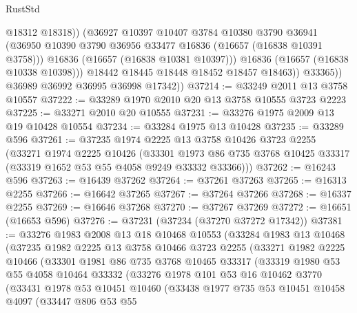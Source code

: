 \begin{lexlean}{RustStd}
\begin{coremodule}
                      @18312
                      @18318))
                  (@36927
                    @10397
                    @10407
                    @3784
                    @10380
                    @3790
                    @36941
                    (@36950 @10390 @3790 @36956 @33477 @16836 (@16657 (@16838 @10391 @3758)))
                    @16836
                    (@16657 (@16838 @10381 @10397)))
                  @16836
                  (@16657 (@16838 @10338 @10398)))
                @18442
                @18445
                @18448
                @18452
                @18457
                @18463))
            @33365))
        @36989
        @36992
        @36995
        @36998
        @17342))
@37214 := @33249 @2011 @13 @3758 @10557
@37222 := @33289 @1970 @2010 @20 @13 @3758 @10555 @3723 @2223
@37225 := @33271 @2010 @20 @10555
@37231 := @33276 @1975 @2009 @13 @19 @10428 @10554
@37234 := @33284 @1975 @13 @10428
@37235 := @33289 @596
@37261 := @37235
    @1974
    @2225
    @13
    @3758
    @10426
    @3723
    @2255
    (@33271
      @1974
      @2225
      @10426
      (@33301 @1973 @86 @735 @3768 @10425 @33317 (@33319 @1652 @53 @55 @4058 @9249 @33332 @33366)))
@37262 := @16243 @596
@37263 := @16439 @37262
@37264 := @37261 @37263
@37265 := @16313 @2255
@37266 := @16642 @37265
@37267 := @37264 @37266
@37268 := @16337 @2255
@37269 := @16646 @37268
@37270 := @37267 @37269
@37272 := @16651 (@16653 @596)
@37276 := @37231 (@37234 (@37270 @37272 @17342))
@37381 := @33276
    @1983
    @2008
    @13
    @18
    @10468
    @10553
    (@33284
      @1983
      @13
      @10468
      (@37235
        @1982
        @2225
        @13
        @3758
        @10466
        @3723
        @2255
        (@33271
          @1982
          @2225
          @10466
          (@33301
            @1981
            @86
            @735
            @3768
            @10465
            @33317
            (@33319
              @1980
              @53
              @55
              @4058
              @10464
              @33332
              (@33276
                @1978
                @101
                @53
                @16
                @10462
                @3770
                (@33431
                  @1978
                  @53
                  @10451
                  @10460
                  (@33438
                    @1977
                    @735
                    @53
                    @10451
                    @10458
                    @4097
                    (@33447
                      @806
                      @53
                      @55

\end{coremodule}
\end{lexlean}
